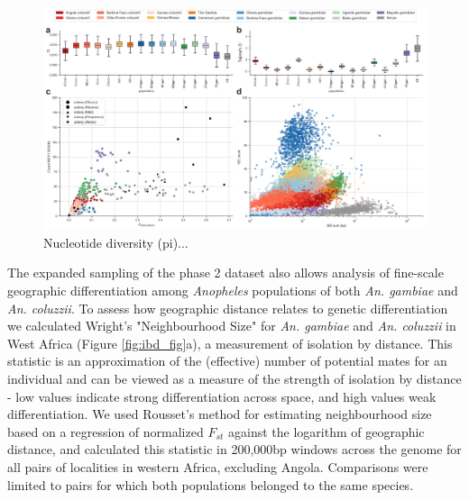 \documentclass[a4paper,11pt,abstracton,hidelinks]{scrartcl}
\begin{document}
\begin{figure}[H]
	\begin{center}
		\includegraphics*[width=6.3in]{artwork/diversity_composite.jpeg}
	\end{center}
	\caption{Nucleotide diversity (pi)...}
	\label{div}
\end{figure}



The expanded sampling of the phase 2 dataset also allows analysis of fine-scale geographic differentiation among \textit{Anopheles} populations of both \textit{An. gambiae} and \textit{An. coluzzii}.
%
To assess how geographic distance relates to genetic differentiation we calculated Wright's "Neighbourhood Size" \cite{wright1946isolation} for \textit{An. gambiae} and \textit{An. coluzzii} in West Africa (Figure \ref{fig:ibd_fig}a), a measurement of isolation by distance.
%
This statistic is an approximation of the (effective) number of potential mates for an individual and can be viewed as a measure of the strength of isolation by distance - low values indicate strong differentiation across space, and high values weak differentiation.
%
We used Rousset's \cite{rousset1997genetic} method for estimating neighbourhood size based on a regression of normalized $F_{st}$ against the logarithm of geographic distance, and calculated this statistic in 200,000bp windows across the genome for all pairs of localities in western Africa, excluding Angola. 
%
Comparisons were limited to pairs for which both populations belonged to the same species.
\end{document}
